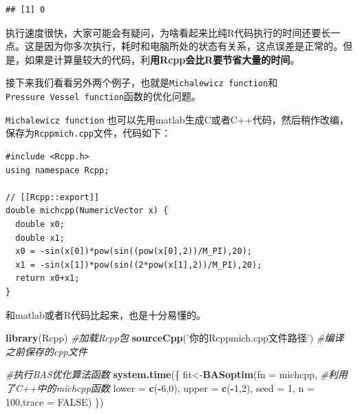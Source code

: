 \documentclass[]{ctexbook}
\newenvironment{Shaded}{\begin{snugshade}}{\end{snugshade}}
\newcommand{\KeywordTok}[1]{\textcolor[rgb]{0.13,0.29,0.53}{\textbf{#1}}}
\newcommand{\DataTypeTok}[1]{\textcolor[rgb]{0.13,0.29,0.53}{#1}}
\newcommand{\DecValTok}[1]{\textcolor[rgb]{0.00,0.00,0.81}{#1}}
\newcommand{\StringTok}[1]{\textcolor[rgb]{0.31,0.60,0.02}{#1}}
\newcommand{\CommentTok}[1]{\textcolor[rgb]{0.56,0.35,0.01}{\textit{#1}}}
\newcommand{\OtherTok}[1]{\textcolor[rgb]{0.56,0.35,0.01}{#1}}
\newcommand{\OperatorTok}[1]{\textcolor[rgb]{0.81,0.36,0.00}{\textbf{#1}}}
\newcommand{\NormalTok}[1]{#1}
\begin{document}
\begin{verbatim}
## [1] 0
\end{verbatim}

执行速度很快，大家可能会有疑问，为啥看起来比纯R代码执行的时间还要长一点。这是因为你多次执行，耗时和电脑所处的状态有关系，这点误差是正常的。但是，如果是计算量较大的代码，利\textbf{用Rcpp会比R要节省大量的时间}。

接下来我们看看另外两个例子，也就是\texttt{Michalewicz\ function}和\texttt{Pressure\ Vessel\ function}函数的优化问题。

\texttt{Michalewicz\ function}
也可以先用matlab生成C或者C++代码，然后稍作改编，保存为\texttt{Rcppmich.cpp}文件，代码如下：

\begin{verbatim}
#include <Rcpp.h>
using namespace Rcpp;

// [[Rcpp::export]]
double michcpp(NumericVector x) {
  double x0;
  double x1;
  x0 = -sin(x[0])*pow(sin((pow(x[0],2))/M_PI),20);
  x1 = -sin(x[1])*pow(sin((2*pow(x[1],2))/M_PI),20);
  return x0+x1;
}
\end{verbatim}

和matlab或者R代码比起来，也是十分易懂的。

\begin{Shaded}
\begin{Highlighting}[]
\KeywordTok{library}\NormalTok{(Rcpp) }\CommentTok{#加载Rcpp包}
\KeywordTok{sourceCpp}\NormalTok{(}\StringTok{'你的Rcppmich.cpp文件路径'}\NormalTok{) }\CommentTok{#编译之前保存的cpp文件}
\end{Highlighting}
\end{Shaded}

\begin{Shaded}
\begin{Highlighting}[]
\CommentTok{#执行BAS优化算法函数}
\KeywordTok{system.time}\NormalTok{(\{}
\NormalTok{  fit<-}\KeywordTok{BASoptim}\NormalTok{(}\DataTypeTok{fn =}\NormalTok{ michcpp, }\CommentTok{#利用了C++中的michcpp函数}
                \DataTypeTok{lower =} \KeywordTok{c}\NormalTok{(}\OperatorTok{-}\DecValTok{6}\NormalTok{,}\DecValTok{0}\NormalTok{), }\DataTypeTok{upper =} \KeywordTok{c}\NormalTok{(}\OperatorTok{-}\DecValTok{1}\NormalTok{,}\DecValTok{2}\NormalTok{),}
                \DataTypeTok{seed =} \DecValTok{1}\NormalTok{, }\DataTypeTok{n =} \DecValTok{100}\NormalTok{,}\DataTypeTok{trace =} \OtherTok{FALSE}\NormalTok{)}
\NormalTok{\})}
\end{Highlighting}
\end{Shaded}
\end{document}

